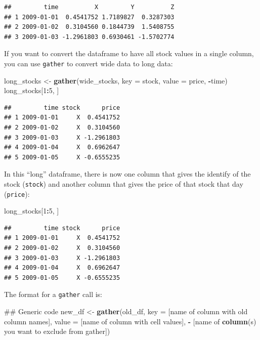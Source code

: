 \documentclass[]{book}
\makeatletter
\newenvironment{Shaded}{\begin{snugshade}}{\end{snugshade}}
\newcommand{\KeywordTok}[1]{\textcolor[rgb]{0.13,0.29,0.53}{\textbf{#1}}}
\newcommand{\DataTypeTok}[1]{\textcolor[rgb]{0.13,0.29,0.53}{#1}}
\newcommand{\DecValTok}[1]{\textcolor[rgb]{0.00,0.00,0.81}{#1}}
\newcommand{\StringTok}[1]{\textcolor[rgb]{0.31,0.60,0.02}{#1}}
\newcommand{\OperatorTok}[1]{\textcolor[rgb]{0.81,0.36,0.00}{\textbf{#1}}}
\newcommand{\NormalTok}[1]{#1}
\newenvironment{kframe}{%
\medskip{}
\setlength{\fboxsep}{.8em}
 \def\at@end@of@kframe{}%
 \ifinner\ifhmode%
  \def\at@end@of@kframe{\end{minipage}}%
  \begin{minipage}{\columnwidth}%
 \fi\fi%
 \def\FrameCommand##1{\hskip\@totalleftmargin \hskip-\fboxsep
 \colorbox{shadecolor}{##1}\hskip-\fboxsep
     \hskip-\linewidth \hskip-\@totalleftmargin \hskip\columnwidth}%
 \MakeFramed {\advance\hsize-\width
   \@totalleftmargin\z@ \linewidth\hsize
   \@setminipage}}%
 {\par\unskip\endMakeFramed%
 \at@end@of@kframe}
\renewenvironment{Shaded}{\begin{kframe}}{\end{kframe}}
\theoremstyle{definition}
\theoremstyle{definition}
\theoremstyle{definition}
\theoremstyle{remark}
\makeatother
\begin{document}
\begin{verbatim}
##         time          X         Y          Z
## 1 2009-01-01  0.4541752 1.7189827  0.3287303
## 2 2009-01-02  0.3104560 0.1844739  1.5408755
## 3 2009-01-03 -1.2961803 0.6930461 -1.5702774
\end{verbatim}

If you want to convert the dataframe to have all stock values in a
single column, you can use \texttt{gather} to convert wide data to long
data:

\begin{Shaded}
\begin{Highlighting}[]
\NormalTok{long_stocks <-}\StringTok{ }\KeywordTok{gather}\NormalTok{(wide_stocks, }\DataTypeTok{key =}\NormalTok{ stock,}
                      \DataTypeTok{value =}\NormalTok{ price, }\OperatorTok{-}\NormalTok{time)}
\NormalTok{long_stocks[}\DecValTok{1}\OperatorTok{:}\DecValTok{5}\NormalTok{, ]}
\end{Highlighting}
\end{Shaded}

\begin{verbatim}
##         time stock      price
## 1 2009-01-01     X  0.4541752
## 2 2009-01-02     X  0.3104560
## 3 2009-01-03     X -1.2961803
## 4 2009-01-04     X  0.6962647
## 5 2009-01-05     X -0.6555235
\end{verbatim}

In this ``long'' dataframe, there is now one column that gives the
identify of the stock (\texttt{stock}) and another column that gives the
price of that stock that day (\texttt{price}):

\begin{Shaded}
\begin{Highlighting}[]
\NormalTok{long_stocks[}\DecValTok{1}\OperatorTok{:}\DecValTok{5}\NormalTok{, ]}
\end{Highlighting}
\end{Shaded}

\begin{verbatim}
##         time stock      price
## 1 2009-01-01     X  0.4541752
## 2 2009-01-02     X  0.3104560
## 3 2009-01-03     X -1.2961803
## 4 2009-01-04     X  0.6962647
## 5 2009-01-05     X -0.6555235
\end{verbatim}

The format for a \texttt{gather} call is:

\begin{Shaded}
\begin{Highlighting}[]
\NormalTok{## Generic code}
\NormalTok{new_df <-}\StringTok{ }\KeywordTok{gather}\NormalTok{(old_df,}
                 \DataTypeTok{key =}\NormalTok{ [name of column with old column names],}
                 \DataTypeTok{value =}\NormalTok{ [name of column with cell values],}
                 \OperatorTok{-}\StringTok{ }\NormalTok{[name of }\KeywordTok{column}\NormalTok{(s) you want to }
\NormalTok{                    exclude from gather])}
\end{Highlighting}
\end{Shaded}
\end{document}
